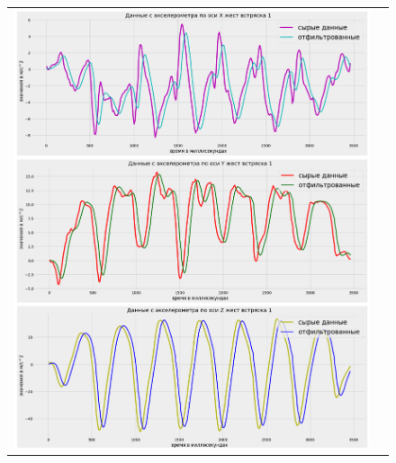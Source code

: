 \begin{figure}[H]
    \begin{center}
        \begin{tabular}{cc}
            \includegraphics[width=1\textwidth]{farim/shak.png} & 
        \end{tabular}
    \end{center}
\end{figure}